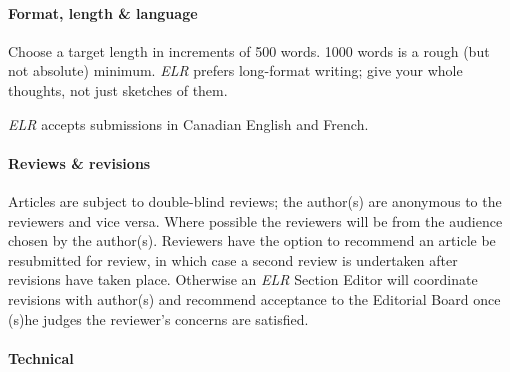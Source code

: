 \paragraph{Format, length \& language}
Choose a target length in increments of 500 words.
1000 words is a rough (but not absolute) minimum.
\emph{ELR} prefers long-format writing; give your whole thoughts, not just sketches of them.

\emph{ELR} accepts submissions in Canadian English and French.

\paragraph{Reviews \& revisions}
Articles are subject to double-blind reviews; the author(s) are anonymous to the reviewers and vice versa.
Where possible the reviewers will be from the audience chosen by the author(s).
Reviewers have the option to recommend an article be resubmitted for review, in which case a second review is undertaken after revisions have taken place.
Otherwise an \emph{ELR} Section Editor will coordinate revisions with author(s) and recommend acceptance to the Editorial Board once (s)he judges the reviewer's concerns are satisfied.

\paragraph{Technical}

